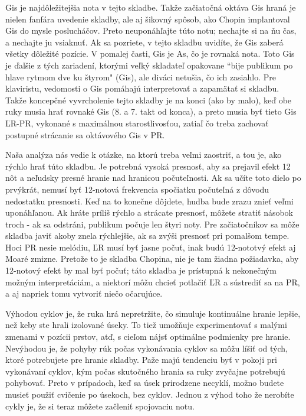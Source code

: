 Gis je najdôležitejšia nota v tejto skladbe. Takže začiatočná oktáva Gis hraná  je nielen fanfára uvedenie skladby, ale aj šikovný spôsob, ako Chopin implantoval Gis do mysle poslucháčov. Preto neuponáhľajte túto notu; nechajte si na ňu čas, a nechajte ju vsiaknuť. Ak sa pozriete, v tejto skladbu uvidíte, že Gis zaberá všetky dôležité pozície. V pomalej časti, Gis je As, čo je rovnaká nota. Toto Gis je ďalšie z tých zariadení, ktorými veľký skladateľ opakovane “bije publikum po hlave rytmom dve ku štyrom" (Gis), ale diváci netušia, čo ich zasiahlo. Pre klaviristu, vedomosti o Gis pomáhajú interpretovať a zapamätať si skladbu. Takže koncepčné vyvrcholenie tejto skladby je na konci (ako by malo), keď obe ruky musia hrať rovnaké Gis (8. a 7. takt od konca), a preto musia byť tieto Gis ĽR-PR, vykonané s maximálnou starostlivosťou, zatiaľ čo treba zachovať postupné strácanie sa oktávového Gis v PR.

Naša analýza nás vedie k otázke, na ktorú treba veľmi zaostriť, a tou je, ako rýchlo hrať túto skladbu. Je potrebná vysoká presnosť, aby sa prejavil efekt 12 nôt a neľudsky presné hranie nad hranicou počuteľnosti. Ak sa učíte toto dielo po prvýkrát, nemusí byť 12-notová frekvencia spočiatku počuteľná z dôvodu nedostatku presnosti. Keď na to konečne dôjdete, hudba bude zrazu znieť veľmi uponáhľanou. Ak hráte príliš rýchlo a strácate presnosť, môžete stratiť násobok troch - ak sa odstráni, publikum počuje len štyri noty. Pre začiatočníkov sa môže skladba javiť akoby znela rýchlejšie, ak sa zvýši presnosť pri pomalšom tempe. Hoci PR nesie melódiu, ĽR musí byť jasne počuť, inak budú 12-nototvý efekt aj Moaré zmizne. Pretože to je skladba Chopina, nie je tam žiadna požiadavka, aby 12-notový efekt by mal byť počuť; táto skladba je prístupná k nekonečným možným interpretáciám, a niektorí môžu chcieť potlačiť ĽR a sústrediť sa na PR, a aj napriek tomu vytvoriť niečo očarujúce.

Výhodou cyklov je, že ruka hrá nepretržite, čo simuluje kontinuálne hranie lepšie, než keby ste hrali izolované úseky. To tiež umožňuje experimentovať s malými zmenami v pozícii prstov, atď, s cieľom nájsť optimálne podmienky pre hranie. Nevýhodou je, že pohyby rúk počas vykonávania cyklov sa môžu líšiť od tých, ktoré potrebujete pre hranie skladby. Paže majú tendenciu byť v pokoji pri vykonávaní cyklov, kým počas skutočného hrania sa ruky zvyčajne potrebujú pohybovať. Preto v prípadoch, keď sa úsek prirodzene necyklí, možno budete musieť použiť cvičenie po úsekoch, bez cyklov. Jednou z výhod toho že nerobíte cykly je, že si teraz môžete začleniť spojovaciu notu.

